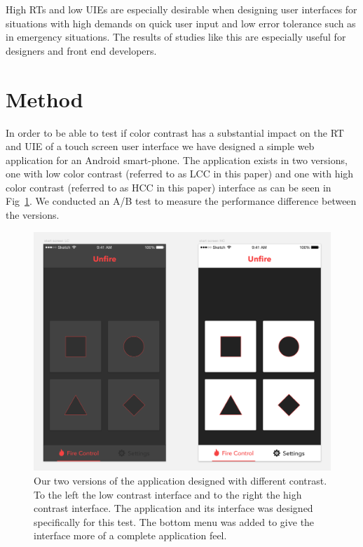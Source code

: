 \documentclass[runningheads,a4paper]{llncs}
\begin{document}
High RTs and low UIEs are especially desirable when designing user interfaces for situations with high demands on quick user input and low error tolerance such as in emergency situations. The results of studies like this are especially useful for designers and front end developers.

\section{Method}
In order to be able to test if color contrast has a substantial impact on the RT and UIE of a touch screen user interface we have designed a simple web application for an Android smart-phone. The application exists in two versions, one with low color contrast (referred to as LCC in this paper) and one with high color contrast (referred to as HCC in this paper) interface as can be seen in Fig~\ref{fig:application}. We conducted an A/B test to measure the performance difference between the versions.

\begin{figure}
	\centering
	\includegraphics[width=\textwidth]{application}
	\caption{Our two versions of the application designed with different contrast. To the left the low contrast interface and to the right the high contrast interface. The application and its interface was designed specifically for this test. The bottom menu was added to give the interface more of a complete application feel. 
	\label{fig:application}}
\end{figure}
\end{document}
